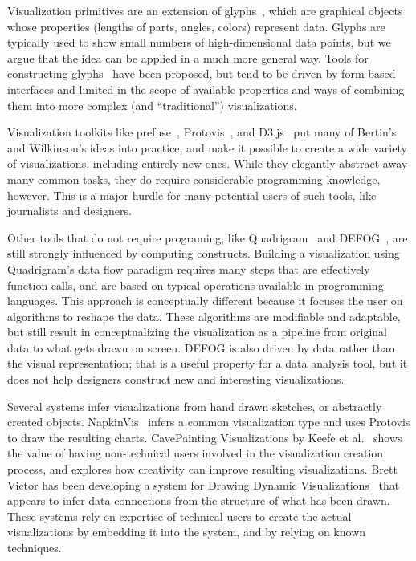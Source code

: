 Visualization primitives are an extension of glyphs~\cite{anderson1957semigraphical}, which are graphical objects whose properties (lengths of parts, angles, colors) represent data.
Glyphs are typically used to show small numbers of high-dimensional data points, but we argue that the idea can be applied in a much more general way.
Tools for constructing glyphs~\cite{ribarsky1994glyphmaker} have been proposed, but tend to be driven by form-based interfaces and limited in the scope of available properties and ways of combining them into more complex (and ``traditional'') visualizations.

\label{tools}

Visualization toolkits like prefuse~\cite{heer2005prefuse}, Protovis~\cite{bostock2009Protovis}, and D3.js~\cite{bostock2011d3} put many of Bertin's and Wilkinson's ideas into practice, and make it possible to create a wide variety of visualizations, including entirely new ones.
While they elegantly abstract away many common tasks, they do require considerable programming knowledge, however.
This is a major hurdle for many potential users of such tools, like journalists and designers.

Other tools that do not require programing, like Quadrigram~\cite{url:quadrigram,Ortiz2010} and DEFOG~\cite{Lins:TR:2011}, are still strongly influenced by computing constructs.
Building a visualization using Quadrigram's data flow paradigm requires many steps that are effectively function calls, and are based on typical operations available in programming languages.
This approach is conceptually different because it focuses the user on algorithms to reshape the data.
These algorithms are modifiable and adaptable, but still result in conceptualizing the visualization as a pipeline from original data to what gets drawn on screen.
DEFOG is also driven by data rather than the visual representation; that is a useful property for a data analysis tool, but it does not help designers construct new and interesting visualizations.

Several systems infer visualizations from hand drawn sketches, or abstractly created objects.
NapkinVis~\cite{Chao2010} infers a common visualization type and uses Protovis to draw the resulting charts.
CavePainting Visualizations by Keefe et al.~\cite{Keefe-2008-SSF} shows the value of having non-technical users involved in the visualization creation process, and explores how creativity can improve resulting visualizations.
Brett Victor has been developing a system for Drawing Dynamic Visualizations~\cite{url:drawingDynamic} that appears to infer data connections from the structure of what has been drawn.
These systems rely on expertise of technical users to create the actual visualizations by embedding it into the system, and by relying on known techniques.

